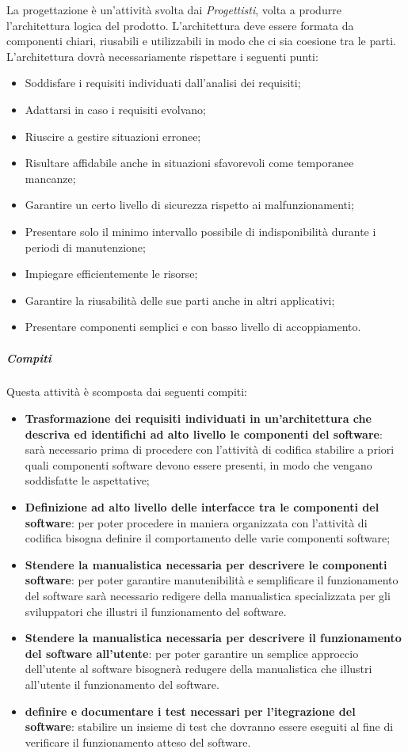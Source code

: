 La progettazione è un'attività svolta dai \emph{Progettisti}, volta a produrre l'architettura logica del prodotto.
L'architettura deve essere formata da componenti chiari, riusabili e utilizzabili in modo che ci sia coesione tra
le parti.\\
L'architettura dovrà necessariamente rispettare i seguenti punti:
\begin{itemize}
    \item Soddisfare i requisiti individuati dall'analisi dei requisiti;
    \item Adattarsi in caso i requisiti evolvano;
    \item Riuscire a gestire situazioni erronee;
    \item Risultare affidabile anche in situazioni sfavorevoli come temporanee mancanze;
    \item Garantire un certo livello di sicurezza rispetto ai malfunzionamenti;
    \item Presentare solo il minimo intervallo possibile di indisponibilità durante i periodi di manutenzione;
    \item Impiegare efficientemente le risorse;
    \item Garantire la riusabilità delle sue parti anche in altri applicativi;
    \item Presentare componenti semplici e con basso livello di accoppiamento.
\end{itemize}

\subparagraph{Compiti}
\label{par:progettazione:compiti}
Questa attività è scomposta dai seguenti compiti:
\begin{itemize}
    \item \textbf{Trasformazione dei requisiti individuati in un'architettura che descriva ed identifichi ad alto livello le componenti del software}: sarà necessario prima di procedere con l'attività di codifica stabilire a priori quali componenti software devono essere presenti, in modo che vengano soddisfatte le aspettative;
    \item \textbf{Definizione ad alto livello delle interfacce tra le componenti del software}: per poter procedere in maniera organizzata con l'attività di codifica bisogna definire il comportamento delle varie componenti software;
    \item \textbf{Stendere la manualistica necessaria per descrivere le componenti software}: per poter garantire manutenibilità e semplificare il funzionamento del software sarà necessario redigere della manualistica specializzata per gli sviluppatori che illustri il funzionamento del software.
    \item \textbf{Stendere la manualistica necessaria per descrivere il funzionamento del software all'utente}: per poter garantire un semplice approccio dell'utente al software bisognerà redugere della manualistica che illustri all'utente il funzionamento del software.
    \item \textbf{definire e documentare i test necessari per l'itegrazione del software}: stabilire un insieme di test che dovranno essere eseguiti al fine di verificare il funzionamento atteso del software.
\end{itemize}

